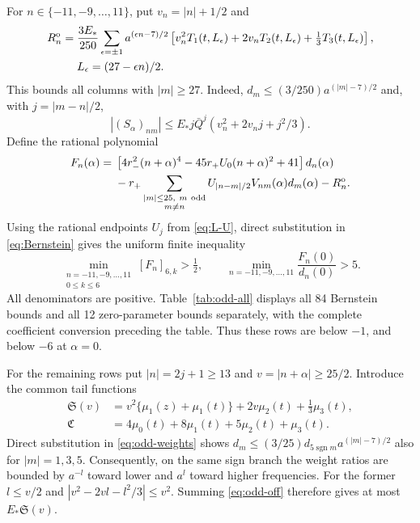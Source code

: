 For $n\in\{-11,-9,\ldots,11\}$, put $v_n=|n|+1/2$ and
\begin{align}
 R_n^{\rm o}={}&\frac{3E_*}{250}\sum_{\epsilon=\pm1}a^{(\epsilon n-7)/2}
 \left[v_n^2T_1(t,L_\epsilon)+2v_nT_2(t,L_\epsilon)
 +\tfrac13T_3(t,L_\epsilon)\right],\label{eq:odd-row-tail}\\
 &L_\epsilon=(27-\epsilon n)/2.\nonumber
\end{align}
This bounds all columns with $|m|\ge27$. Indeed, $d_m\le(3/250)a^{(|m|-7)/2}$ and, with $j=|m-n|/2$,
\begin{equation}\label{eq:complex-off-majorant}
 |(S_\alpha)_{nm}|\le E_*j\bar Q^j
 (v_n^2+2v_nj+j^2/3).
\end{equation}
Define the rational polynomial
\begin{align}
 F_n(\alpha)={}&\left[4r_-^2(n+\alpha)^4-45r_+U_0(n+\alpha)^2+41\right]d_n(\alpha)
 \nonumber\\
 &-r_+\sum_{\substack{|m|\le25,\ m\ \mathrm{odd}\\m\ne n}}
 U_{|n-m|/2}V_{nm}(\alpha)d_m(\alpha)-R_n^{\rm o}.
 \label{eq:odd-F}
\end{align}
Using the rational endpoints $U_j$ from \eqref{eq:L-U}, direct substitution in \eqref{eq:Bernstein} gives the uniform finite inequality
\begin{equation}\label{eq:odd-uniform}
 \min_{\substack{n=-11,-9,\ldots,11\\0\le k\le6}}[F_n]_{6,k}>\tfrac12,\qquad
 \min_{n=-11,-9,\ldots,11}\frac{F_n(0)}{d_n(0)}>5.
\end{equation}
All denominators are positive. Table~\ref{tab:odd-all} displays all 84 Bernstein bounds and all 12 zero-parameter bounds separately, with the complete coefficient conversion preceding the table. Thus these rows are below $-1$, and below $-6$ at $\alpha=0$.

For the remaining rows put $|n|=2j+1\ge13$ and $v=|n+\alpha|\ge25/2$. Introduce the common tail functions
\begin{equation}\label{eq:common-tail-moments}
\begin{aligned}
 \mathfrak S(v)&=v^2\{\mu_1(z)+\mu_1(t)\}+2v\mu_2(t)+\tfrac13\mu_3(t),\\
 \mathfrak C&=4\mu_0(t)+8\mu_1(t)+5\mu_2(t)+\mu_3(t).
\end{aligned}
\end{equation}
Direct substitution in \eqref{eq:odd-weights} shows $d_m\le(3/25)d_{5\operatorname{sgn}m}a^{(|m|-7)/2}$ also for $|m|=1,3,5$. Consequently, on the same sign branch the weight ratios are bounded by $a^{-l}$ toward lower and $a^l$ toward higher frequencies. For the former $l\le v/2$ and $|v^2-2vl-l^2/3|\le v^2$. Summing \eqref{eq:odd-off} therefore gives at most $E_*\mathfrak S(v)$.


